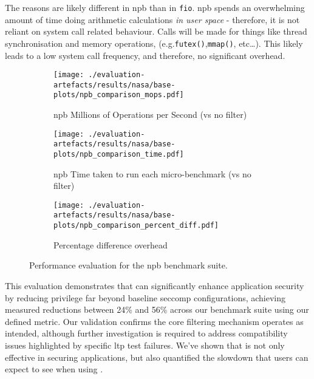 The reasons are likely different in \ac{npb} than in \texttt{fio}. \ac{npb}
spends an overwhelming amount of time doing arithmetic calculations \textit{in
user space} - therefore, it is not reliant on system call related behaviour.
Calls will be made for things like thread synchronisation and memory 
operations, (e.g.\texttt{futex()},{}\texttt{mmap()}, etc\dots). This likely
leads to a low system call frequency, and therefore, no significant overhead.

\begin{figure}[htbp]
    \centering
    \begin{subfigure}[b]{0.7 \textwidth}
        \centering
        \texttt{[image: ./evaluation-artefacts/results/nasa/base-plots/npb\_comparison\_mops.pdf]} 
        \caption{\ac{npb} Millions of Operations per Second (\af vs no filter)}
        \label{fig:npb-mops}
    \end{subfigure}
    \hfill
     \begin{subfigure}[b]{0.7 \textwidth}
        \centering
        \texttt{[image: ./evaluation-artefacts/results/nasa/base-plots/npb\_comparison\_time.pdf]} 
        \caption{\ac{npb} Time taken to run each micro-benchmark (\af vs no
        filter)}
        \label{fig:npb-time}
    \end{subfigure}
     \medskip 
     \begin{subfigure}[b]{0.7 \textwidth}
        \centering
        \texttt{[image: ./evaluation-artefacts/results/nasa/base-plots/npb\_comparison\_percent\_diff.pdf]} %
        \caption{Percentage difference overhead}
        \label{fig:npb-percdiff}
    \end{subfigure}

    \caption{Performance evaluation for the \ac{npb} benchmark suite.}
    \label{fig:npb-perf}
\end{figure}

This evaluation demonstrates that \af can significantly enhance
application security by reducing privilege far beyond baseline seccomp
configurations, achieving measured reductions between 24\% and 56\% across
our benchmark suite using our defined metric. Our validation
confirms the core filtering mechanism operates as intended, although further
investigation is required to address compatibility issues highlighted by
specific \ac{ltp} test failures. We've shown that \af is not only effective
in securing applications, but also quantified the slowdown that users can 
expect to see when using \af.
